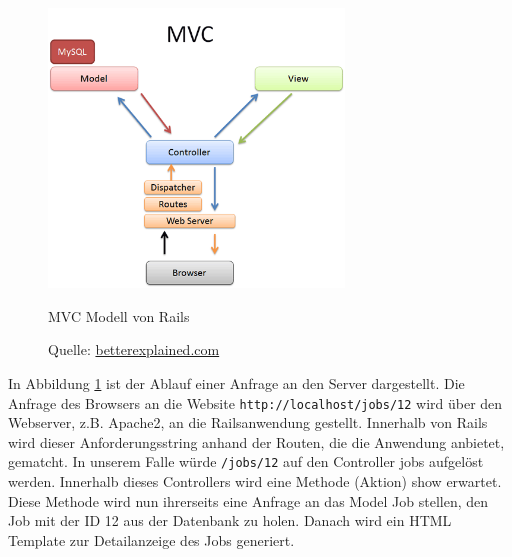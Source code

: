 \begin{figure}[h]
  \centering
  \includegraphics[width=0.7\textwidth]{./material/mvc-rails.png}
  \caption{MVC Modell von Rails}
  \caption*{Quelle: \href{http://betterexplained.com/articles/intermediate-rails-understanding-models-views-and-controllers/}{betterexplained.com}}
 \label{fig:mvcrails}
\end{figure}
In Abbildung \ref{fig:mvcrails} ist der Ablauf einer Anfrage an den Server dargestellt. Die Anfrage des Browsers an die Website \texttt{http://localhost/jobs/12} wird über den Webserver, z.B. Apache2, an die Railsanwendung gestellt. Innerhalb von Rails wird dieser Anforderungsstring anhand der Routen, die die Anwendung anbietet, gematcht. In unserem Falle würde \texttt{/jobs/12} auf den Controller jobs aufgelöst werden. Innerhalb dieses Controllers wird eine Methode (Aktion) show erwartet.
Diese Methode wird nun ihrerseits eine Anfrage an das Model Job stellen, den Job mit der ID 12 aus der Datenbank zu holen. Danach wird ein HTML Template zur Detailanzeige des Jobs generiert.

\setlength{\epigraphwidth}{\marginparwidth}
\setlength{\epigraphwidth}{0.8\textwidth}

